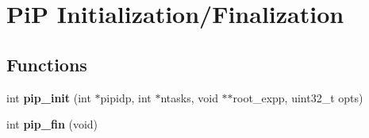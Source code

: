 \hypertarget{group__pip-0-init-fin}{\section{Pi\-P Initialization/\-Finalization}
\label{group__pip-0-init-fin}
}
\subsection*{Functions}
\begin{DoxyCompactItemize}
\item 
\hypertarget{group__pip-0-init-fin_ga20439326ff318c2dd0752bd544dca0e2}{int {\bfseries pip\-\_\-init} (int $\ast$pipidp, int $\ast$ntasks, void $\ast$$\ast$root\-\_\-expp, uint32\-\_\-t opts)}\label{group__pip-0-init-fin_ga20439326ff318c2dd0752bd544dca0e2}

\item 
\hypertarget{group__pip-0-init-fin_gac4654282785abb9434ce81573fdf16ed}{int {\bfseries pip\-\_\-fin} (void)}\label{group__pip-0-init-fin_gac4654282785abb9434ce81573fdf16ed}

\end{DoxyCompactItemize}


